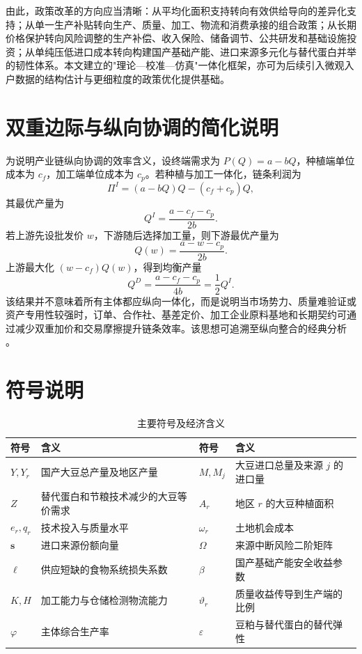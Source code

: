 \documentclass[UTF8,zihao=-4,fontset=fandol]{ctexart}
\numberwithin{equation}{section}
\theoremstyle{definition}
\theoremstyle{remark}
\begin{document}
由此，政策改革的方向应当清晰：从平均化面积支持转向有效供给导向的差异化支持；从单一生产补贴转向生产、质量、加工、物流和消费承接的组合政策；从长期价格保护转向风险调整的生产补偿、收入保险、储备调节、公共研发和基础设施投资；从单纯压低进口成本转向构建国产基础产能、进口来源多元化与替代蛋白并举的韧性体系。本文建立的"理论—校准—仿真"一体化框架，亦可为后续引入微观入户数据的结构估计与更细粒度的政策优化提供基础。

\appendix
\section{双重边际与纵向协调的简化说明}

为说明产业链纵向协调的效率含义，设终端需求为 $P(Q)=a-bQ$，种植端单位成本为 $c_f$，加工端单位成本为 $c_p$。若种植与加工一体化，链条利润为
\begin{equation}
 \Pi^I=(a-bQ)Q-(c_f+c_p)Q,
\end{equation}
其最优产量为
\begin{equation}
 Q^I=\frac{a-c_f-c_p}{2b}.
\end{equation}
若上游先设批发价 $w$，下游随后选择加工量，则下游最优产量为
\begin{equation}
 Q(w)=\frac{a-w-c_p}{2b}.
\end{equation}
上游最大化 $(w-c_f)Q(w)$，得到均衡产量
\begin{equation}
 Q^D=\frac{a-c_f-c_p}{4b}=\frac{1}{2}Q^I.
\end{equation}
该结果并不意味着所有主体都应纵向一体化，而是说明当市场势力、质量难验证或资产专用性较强时，订单、合作社、基差定价、加工企业原料基地和长期契约可通过减少双重加价和交易摩擦提升链条效率。该思想可追溯至纵向整合的经典分析 \parencite{Spengler1950}。

\section{符号说明}
\begin{table}[H]
\centering
\caption{主要符号及经济含义}
\begin{tabularx}{\textwidth}{p{}X p{}X}
\toprule
符号 & 含义 & 符号 & 含义\\
\midrule
$Y,Y_r$ & 国产大豆总产量及地区产量 & $M,M_j$ & 大豆进口总量及来源 $j$ 的进口量\\
$Z$ & 替代蛋白和节粮技术减少的大豆等价需求 & $A_r$ & 地区 $r$ 的大豆种植面积\\
$e_r,q_r$ & 技术投入与质量水平 & $\omega_r$ & 土地机会成本\\
$\bm s$ & 进口来源份额向量 & $\Omega$ & 来源中断风险二阶矩阵\\
$\ell$ & 供应短缺的食物系统损失系数 & $\beta$ & 国产基础产能安全收益参数\\
$K,H$ & 加工能力与仓储检测物流能力 & $\vartheta_r$ & 质量收益传导到生产端的比例\\
$\varphi$ & 主体综合生产率 & $\varepsilon$ & 豆粕与替代蛋白的替代弹性\\
\bottomrule
\end{tabularx}
\end{table}

\printbibliography[title={参考文献}]
\end{document}
